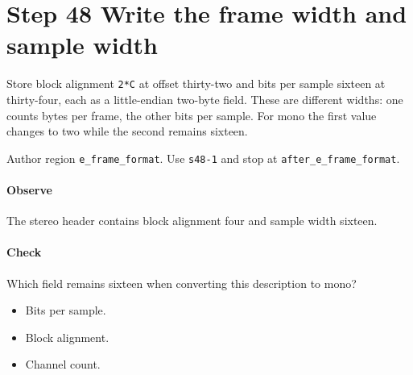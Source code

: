 \section{Step 48 Write the frame width and sample width}\label{pcm-wav-s48}
Store block alignment \texttt{2*C} at offset thirty-two and bits per sample sixteen at thirty-four, each as a little-endian two-byte field. These are different widths: one counts bytes per frame, the other bits per sample. For mono the first value changes to two while the second remains sixteen.

Author region \texttt{e\_frame\_format}. Use \texttt{s48-1} and stop at \texttt{after\_e\_frame\_format}.

\paragraph{Observe} The stereo header contains block alignment four and sample width sixteen.

\paragraph{Check} Which field remains sixteen when converting this description to mono?
\begin{itemize}
  \item[A.] Bits per sample.
  \item[B.] Block alignment.
  \item[C.] Channel count.
\end{itemize}
